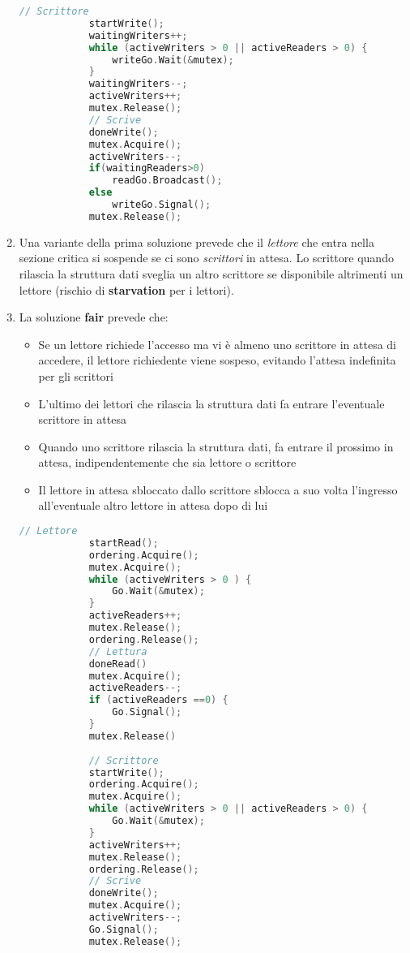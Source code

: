 \begin{example}
\begin{enumerate}
\begin{lstlisting}[language=C]
			// Scrittore
			startWrite();
			waitingWriters++;
			while (activeWriters > 0 || activeReaders > 0) {
				writeGo.Wait(&mutex);
			} 
			waitingWriters--;
			activeWriters++;
			mutex.Release();
			// Scrive
			doneWrite();
			mutex.Acquire();
			activeWriters--;
			if(waitingReaders>0)
				readGo.Broadcast();
			else
				writeGo.Signal();
			mutex.Release();
		\end{lstlisting}
		\item Una variante della prima soluzione prevede che il \textit{lettore} che entra nella sezione critica si sospende se ci sono \textit{scrittori} in attesa. Lo scrittore quando rilascia la struttura dati sveglia un altro scrittore se disponibile altrimenti un lettore (rischio di \textbf{starvation} per i lettori).
		\item La soluzione \textbf{fair} prevede che:
		\begin{itemize}
			\item Se un lettore richiede l’accesso ma vi è almeno uno scrittore in attesa di accedere, il lettore richiedente viene sospeso, evitando l’attesa indefinita per gli scrittori
			\item L’ultimo dei lettori che rilascia la struttura dati fa entrare l’eventuale 
			scrittore in attesa
			\item Quando uno scrittore rilascia la struttura dati, fa entrare il prossimo 
			in attesa, indipendentemente che sia lettore o scrittore
			\item Il lettore in attesa sbloccato dallo scrittore sblocca a suo volta 
			l’ingresso all’eventuale altro lettore in attesa dopo di lui
		\end{itemize}
		\begin{lstlisting}[language=C]
			// Lettore
			startRead();
			ordering.Acquire();
			mutex.Acquire();
			while (activeWriters > 0 ) {
				Go.Wait(&mutex);
			}
			activeReaders++;
			mutex.Release();
			ordering.Release();
			// Lettura
			doneRead()
			mutex.Acquire();
			activeReaders--;
			if (activeReaders ==0) {
				Go.Signal();
			}
			mutex.Release()
			
			// Scrittore
			startWrite();
			ordering.Acquire();
			mutex.Acquire();
			while (activeWriters > 0 || activeReaders > 0) {
				Go.Wait(&mutex);
			} 
			activeWriters++;
			mutex.Release();
			ordering.Release();
			// Scrive
			doneWrite();
			mutex.Acquire();
			activeWriters--;
			Go.Signal();
			mutex.Release();
		\end{lstlisting}
	\end{enumerate}
\end{example}